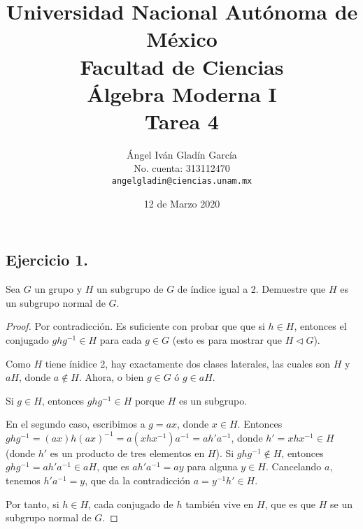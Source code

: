 \documentclass[11pt,letterpaper]{article}
\begin{document}
\title{
        Universidad Nacional Autónoma de México\\
        Facultad de Ciencias\\
        Álgebra Moderna I\\
    \vspace{.5cm}
    \large
        \textbf{Tarea 4}
}
\author{
    Ángel Iván Gladín García\\
    No. cuenta: 313112470\\
    \texttt{angelgladin@ciencias.unam.mx}
}
\date{12 de Marzo 2020}
\maketitle

\newtheorem{theorem}{Teorema}
\newtheorem{example}{Ejemplo}
\newtheorem{corollary}{Corolario}
\newtheorem{lemma}{Lemma}
\newtheorem{definition}{Definicion}
\newtheorem{prop}{Proposicion}

\subsection*{Ejercicio 1.}
Sea $G$ un grupo y $H$ un subgrupo de $G$ de índice igual a 2. Demuestre que $H$ es un subgrupo
normal de $G$.
\begin{proof} Por contradicción.
    Es suficiente con probar que que si $h \in H$, entonces el conjugado $ghg^{-1} \in H$ para cada
    $g \in G$ (esto es para mostrar que $H \lhd G$).

    Como $H$ tiene ínidice 2, hay exactamente dos clases laterales, las cuales son $H$ y $aH$, donde
    $a \notin H$. Ahora, o bien $g \in G$ ó $g \in aH$.

    Si $g \in H$, entonces $ghg^{-1} \in H$ porque $H$ es un subgrupo.

    En el segundo caso, escribimos a $g = ax$, donde $x \in H$. Entonces\\
    $ghg^{-1} = (ax)h(ax)^{-1} = a(xhx^{-1})a^{-1} = ah'a^{-1}$, donde $h' = xhx^{-1} \in H$ 
    (donde $h'$ es un producto de tres elementos en $H$). Si $ghg^{-1} \notin H$, entonces
    $ghg^{-1} = ah'a^{-1} \in aH$, que es $ah'a^{-1} = ay$ para alguna $y \in H$. Cancelando
    $a$, tenemos $h'a^{-1} = y$, que da la contradicción $a = y^{-1}h' \in H$.

    Por tanto, si $h \in H$, cada conjugado de $h$ también vive en $H$, que es que $H$ se un
    subgrupo normal de $G$.
\end{proof}
\end{document}

